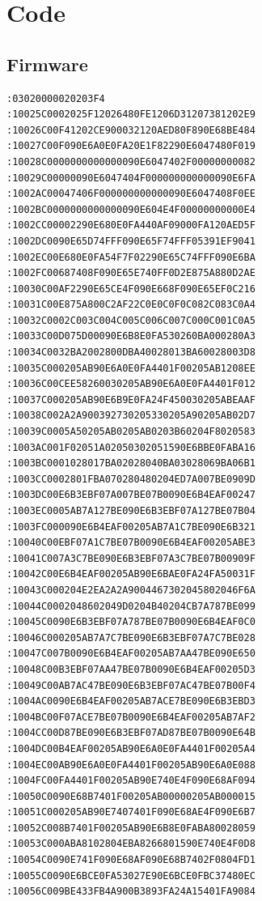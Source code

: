 \documentclass[a4paper,10pt]{article}
\begin{document}
\section{Code}
\subsection{Firmware}
\begin{lstlisting}
:03020000020203F4
:10025C0002025F12026480FE1206D31207381202E9
:10026C00F41202CE900032120AED80F890E68BE484
:10027C00F090E6A0E0FA20E1F82290E6047480F019
:10028C0000000000000090E6047402F00000000082
:10029C00000090E6047404F000000000000090E6FA
:1002AC00047406F000000000000090E6047408F0EE
:1002BC0000000000000090E604E4F00000000000E4
:1002CC00002290E680E0FA440AF09000FA120AED5F
:1002DC0090E65D74FFF090E65F74FFF05391EF9041
:1002EC00E680E0FA54F7F02290E65C74FFF090E6BA
:1002FC00687408F090E65E740FF0D2E875A880D2AE
:10030C00AF2290E65CE4F090E668F090E65EF0C216
:10031C00E875A800C2AF22C0E0C0F0C082C083C0A4
:10032C0002C003C004C005C006C007C000C001C0A5
:10033C00D075D00090E6B8E0FA530260BA000280A3
:10034C0032BA2002800DBA40028013BA60028003D8
:10035C000205AB90E6A0E0FA4401F00205AB1208EE
:10036C00CEE58260030205AB90E6A0E0FA4401F012
:10037C000205AB90E6B9E0FA24F450030205ABEAAF
:10038C002A2A900392730205330205A90205AB02D7
:10039C0005A50205AB0205AB0203B60204F8020583
:1003AC001F02051A02050302051590E6BBE0FABA16
:1003BC0001028017BA02028040BA03028069BA06B1
:1003CC0002801FBA070280480204ED7A007BE0909D
:1003DC00E6B3EBF07A007BE07B0090E6B4EAF00247
:1003EC0005AB7A127BE090E6B3EBF07A127BE07B04
:1003FC000090E6B4EAF00205AB7A1C7BE090E6B321
:10040C00EBF07A1C7BE07B0090E6B4EAF00205ABE3
:10041C007A3C7BE090E6B3EBF07A3C7BE07B00909F
:10042C00E6B4EAF00205AB90E6BAE0FA24FA50031F
:10043C000204E2EA2A2A9004467302045802046F6A
:10044C0002048602049D0204B40204CB7A787BE099
:10045C0090E6B3EBF07A787BE07B0090E6B4EAF0C0
:10046C000205AB7A7C7BE090E6B3EBF07A7C7BE028
:10047C007B0090E6B4EAF00205AB7AA47BE090E650
:10048C00B3EBF07AA47BE07B0090E6B4EAF00205D3
:10049C00AB7AC47BE090E6B3EBF07AC47BE07B00F4
:1004AC0090E6B4EAF00205AB7ACE7BE090E6B3EBD3
:1004BC00F07ACE7BE07B0090E6B4EAF00205AB7AF2
:1004CC00D87BE090E6B3EBF07AD87BE07B0090E64B
:1004DC00B4EAF00205AB90E6A0E0FA4401F00205A4
:1004EC00AB90E6A0E0FA4401F00205AB90E6A0E088
:1004FC00FA4401F00205AB90E740E4F090E68AF094
:10050C0090E68B7401F00205AB00000205AB000015
:10051C000205AB90E7407401F090E68AE4F090E6B7
:10052C008B7401F00205AB90E6B8E0FABA80028059
:10053C000ABA8102804EBA8266801590E740E4F0D8
:10054C0090E741F090E68AF090E68B7402F0804FD1
:10055C0090E6BCE0FA53027E90E6BCE0FBC37480EC
:10056C009BE433FB4A900B3893FA24A15401FA9084

\end{lstlisting}
\end{document}
